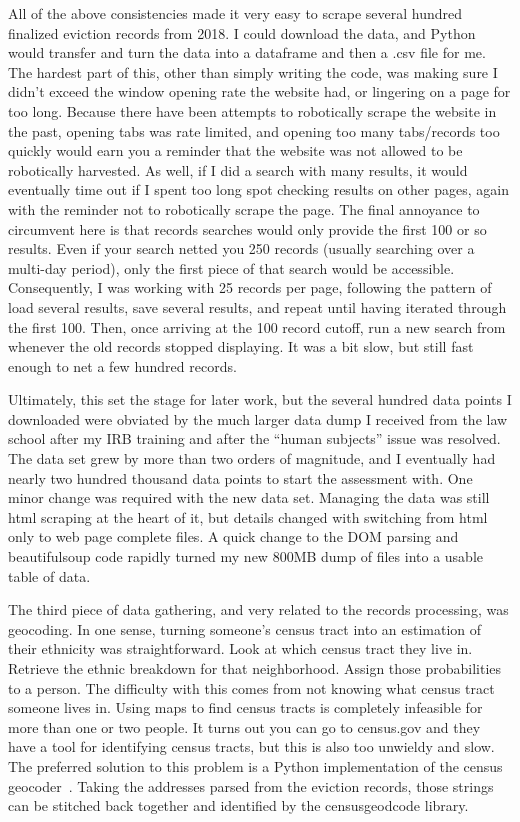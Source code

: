 All of the above consistencies made it very easy to scrape several hundred finalized eviction records from 2018.  I could download the data, and Python would transfer and turn the data into a dataframe and then a .csv file for me.  The hardest part of this, other than simply writing the code, was making sure I didn’t exceed the window opening rate the website had, or lingering on a page for too long.  Because there have been attempts to robotically scrape the website in the past, opening tabs was rate limited, and opening too many tabs/records too quickly would earn you a reminder that the website was not allowed to be robotically harvested.  As well, if I did a search with many results, it would eventually time out if I spent too long spot checking results on other pages, again with the reminder not to robotically scrape the page.  The final annoyance to circumvent here is that records searches would only provide the first 100 or so results.  Even if your search netted you 250 records (usually searching over a multi-day period), only the first piece of that search would be accessible.  Consequently, I was working with 25 records per page, following the pattern of load several results, save several results, and repeat until having iterated through the first 100.  Then, once arriving at the 100 record cutoff, run a new search from whenever the old records stopped displaying.  It was a bit slow, but still fast enough to net a few hundred records.

\par Ultimately, this set the stage for later work, but the several hundred data points I downloaded were obviated by the much larger data dump I received from the law school after my IRB training and after the “human subjects” issue was resolved.  The data set grew by more than two orders of magnitude, and I eventually had nearly two hundred thousand data points to start the assessment with.  One minor change was required with the new data set.  Managing the data was still html scraping at the heart of it, but details changed with switching from html only to web page complete files.  A quick change to the DOM parsing and beautifulsoup code rapidly turned my new 800MB dump of files into a usable table of data.

\par The third piece of data gathering, and very related to the records processing, was geocoding.  In one sense, turning someone’s census tract into an estimation of their ethnicity was straightforward.  Look at which census tract they live in.  Retrieve the ethnic breakdown for that neighborhood.  Assign those probabilities to a person.  The difficulty with this comes from not knowing what census tract someone lives in.  Using maps to find census tracts is completely infeasible for more than one or two people.  It turns out you can go to census.gov and they have a tool for identifying census tracts, but this is also too unwieldy and slow.  The preferred solution to this problem is a Python implementation of the census geocoder~\citep{WEBSITE:14}.  Taking the addresses parsed from the eviction records, those strings can be stitched back together and identified by the censusgeodcode library.

